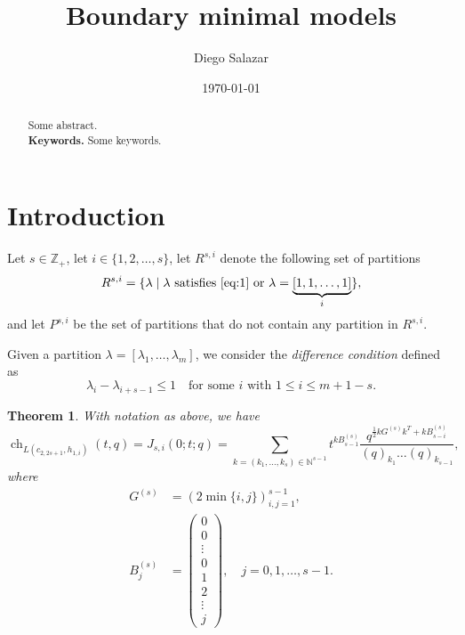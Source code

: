 \documentclass[a4paper, 12pt, reqno]{amsart}
\newtheorem{theorem}{Theorem}[section]
\theoremstyle{remark}
\DeclareMathOperator{\ch}{ch}
\begin{document}
\setcounter{section}{-1}

\begin{abstract}
  Some abstract. \\
  \smallskip
  \noindent \textbf{Keywords.} Some keywords.
\end{abstract}

\title{Boundary minimal models}
\author{Diego Salazar}
\address{Instituto de Matemática Pura e Aplicada, Rio de Janeiro, RJ, Brazil}
\date{\today}
\maketitle

\section{Introduction}
\label{sec:introduction}

Let $s \in \mathbb{Z}_+$, let $i \in \{1, 2, \dots, s\}$, let $R^{s, i}$ denote the following set of partitions
\begin{equation*}
  R^{s, i} = \{\lambda \mid \text{$\lambda$ satisfies \eqref{eq:1} or $\lambda = \underbrace{[1, 1, \dots, 1]}_i$}\},
\end{equation*}
and let $P^{s, i}$ be the set of partitions that do not contain any partition in $R^{s, i}$.

Given a partition $\lambda = [\lambda_1, \dots, \lambda_m]$, we consider the \emph{difference condition} defined as
\begin{equation}
  \label{eq:1}
  \lambda_i - \lambda_{i + s - 1} \le 1 \quad \text{for some $i$ with $1 \le i \le m + 1 - s$}.
\end{equation}

\begin{theorem}
  \label{thr:1}
  With notation as above, we have
  \begin{equation}
    \label{eq:2}
    \ch_{L(c_{2, 2s + 1}, h_{1, i})}(t, q) = J_{s, i}(0; t; q) = \sum_{k = (k_1, \dots, k_s) \in \mathbb{N}^{s - 1}}t^{kB^{(s)}_{s - 1}}\frac{q^{\frac{1}{2}kG^{(s)}k^T + kB^{(s)}_{s - i}}}{(q)_{k_1}\dots(q)_{k_{s - 1}}},
  \end{equation}
  where
  \begin{align*}
    G^{(s)} &= (2\min\{i, j\})_{i, j = 1}^{s - 1}, \\
    B^{(s)}_j &=
                \left(\begin{smallmatrix}
                  0 \\
                  0 \\
                  \vdots \\
                  0 \\
                  1 \\
                  2 \\
                  \vdots \\
                  j
                \end{smallmatrix}\right), \quad j = 0, 1, \dots, s - 1.  
  \end{align*}
\end{theorem}
\end{document}
